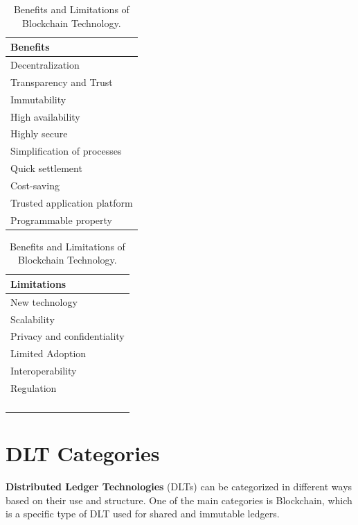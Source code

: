 \begin{table}[ht]
\noindent\begin{minipage}[t]{0.45\textwidth}
\centering
\begin{tabular}{|p{\textwidth}|}
\hline
\rowcolor{Blue!90}
{\textbf{\color{white}Benefits}} \\
\hline
Decentralization \\
Transparency and Trust \\
Immutability \\
High availability \\
Highly secure \\
Simplification of processes \\
Quick settlement  \\
Cost-saving \\
Trusted application platform \\
Programmable property \\
\hline
\end{tabular}
\end{minipage}\hfill
\begin{minipage}[t]{0.45\textwidth}
\centering
\begin{tabular}{|p{\textwidth}|}
\hline
\rowcolor{Blue!90}
{\textbf{\color{white}Limitations}}\\
\hline
New technology \\
Scalability \\
Privacy and confidentiality \\
Limited Adoption \\
Interoperability \\
Regulation \\
\\
\\
\\
\\
\hline
\end{tabular}
\end{minipage}
\caption{Benefits and Limitations of Blockchain Technology.}
\end{table}

\section{DLT Categories}
\textbf{Distributed Ledger Technologies} (DLTs) can be categorized in different ways based on their use and structure. One of the main categories is Blockchain, which is a specific type of DLT used for shared and immutable ledgers.

